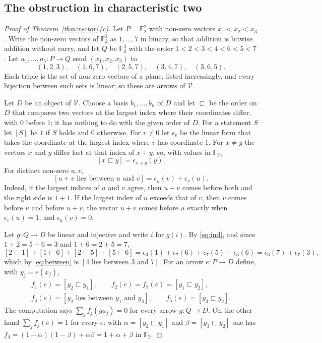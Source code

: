 \documentclass[11pt,a4paper]{article}
\theoremstyle{definition}
\newcommand{\V}{\mathcal{V}}
\newcommand{\F}{\mathbb{F}}
\begin{document}
\subsection{The obstruction in characteristic two}

\begin{proof}[Proof of Theorem~\ref{thm:vector}\,\textup{(c)}]
Let $P=\F_2^2$ with non-zero vectors $x_1<x_2<x_3$. Write the non-zero
vectors of $\F_2^3$ as $1,\dots,7$ in binary, so that addition is bitwise
addition without carry, and let $Q$ be $\F_2^3$ with the order
$1<2<3<4<6<5<7$. Let $a_1,\dots,a_5\colon P\to Q$ send $(x_1,x_2,x_3)$ to
\[
 (1,2,3),\quad(1,6,7),\quad(2,5,7),\quad(3,4,7),\quad(3,6,5).
\]
Each triple is the set of non-zero vectors of a plane, listed increasingly,
and every bijection between such sets is linear; so these are arrows of
$\V$.

Let $D$ be an object of $\V$. Choose a basis $b_1,\dots,b_n$ of $D$ and let
$\sqsubset$ be the order on $D$ that compares two vectors at the largest
index where their coordinates differ, with $0$ before $1$; it has nothing to
do with the given order of $D$. For a statement $S$ let $[S]$ be $1$ if $S$
holds and $0$ otherwise. For $v\ne0$ let $\epsilon_v$ be the linear
form that takes the coordinate at the largest index where $v$ has
coordinate $1$. For $x\ne y$ the vectors $x$ and $y$ differ last at that
index of $x+y$, so, with values in $\F_2$,
\begin{equation}\label{eq:ind}
 [x\sqsubset y]=\epsilon_{x+y}(y).
\end{equation}
For distinct non-zero $u,v$,
\begin{equation}\label{eq:between}
 [u+v\text{ lies between }u\text{ and }v]=\epsilon_u(v)+\epsilon_v(u).
\end{equation}
Indeed, if the largest indices of $u$ and $v$ agree, then $u+v$ comes before
both and the right side is $1+1$. If the largest index of $u$ exceeds that
of $v$, then $v$ comes before $u$ and before $u+v$, the vector $u+v$ comes
before $u$ exactly when $\epsilon_v(u)=1$, and $\epsilon_u(v)=0$.

Let $g\colon Q\to D$ be linear and injective and write $i$ for $g(i)$. By
\eqref{eq:ind}, and since $1+2=5+6=3$ and $1+6=2+5=7$,
\[
 [2\sqsubset1]+[1\sqsubset6]+[2\sqsubset5]+[5\sqsubset6]
 =\epsilon_3(1)+\epsilon_7(6)+\epsilon_7(5)+\epsilon_3(6)
 =\epsilon_3(7)+\epsilon_7(3),
\]
which by \eqref{eq:between} is $[4\text{ lies between }3\text{ and }7]$. For
an arrow $e\colon P\to D$ define, with $y_j=e(x_j)$,
\begin{gather*}
 f_1(e)=[y_2\sqsubset y_1],\qquad f_2(e)=f_3(e)=[y_1\sqsubset y_2],\\
 f_4(e)=[y_2\text{ lies between }y_1\text{ and }y_3],\qquad
 f_5(e)=[y_3\sqsubset y_2].
\end{gather*}
The computation says $\sum_jf_j(ga_j)=0$ for every arrow $g\colon Q\to D$.
On the other hand $\sum_jf_j(e)=1$ for every $e$: with
$\alpha=[y_2\sqsubset y_1]$ and $\beta=[y_3\sqsubset y_2]$ one has
$f_4=(1-\alpha)(1-\beta)+\alpha\beta=1+\alpha+\beta$ in $\F_2$.


\end{proof}
\end{document}
